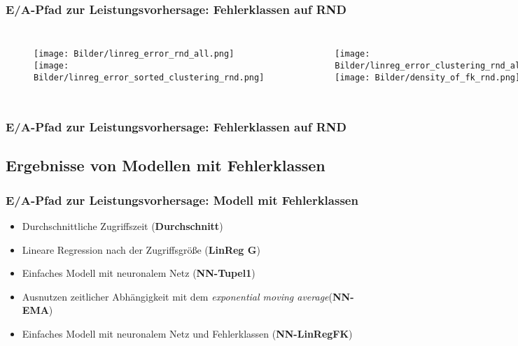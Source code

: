 \documentclass{beamer}
\begin{document}
\begin{frame}
\frametitle{E/A-Pfad zur Leistungsvorhersage: Fehlerklassen auf RND}
\begin{columns}
	\begin{figure}
		\texttt{[image: Bilder/linreg\_error\_rnd\_all.png]}\\
		\texttt{[image: Bilder/linreg\_error\_sorted\_clustering\_rnd.png]}
	\end{figure}
	\begin{figure}
		\texttt{[image: Bilder/linreg\_error\_clustering\_rnd\_all.png]}\\
		\texttt{[image: Bilder/density\_of\_fk\_rnd.png]}
	\end{figure}
\end{columns}
\end{frame}

\begin{frame}
\frametitle{E/A-Pfad zur Leistungsvorhersage: Fehlerklassen auf RND}
\begin{table}
\end{table}
\end{frame}

\subsection{Ergebnisse von Modellen mit Fehlerklassen}
\begin{frame}
\frametitle{E/A-Pfad zur Leistungsvorhersage: Modell mit Fehlerklassen}
\begin{itemize}
	\item Durchschnittliche Zugriffszeit (\textbf{Durchschnitt})
	\item Lineare Regression nach der Zugriffsgröße (\textbf{LinReg G})
	\item Einfaches Modell mit neuronalem Netz (\textbf{NN-Tupel1})
	\item Ausnutzen zeitlicher Abhängigkeit mit dem \textit{exponential moving average}(\textbf{NN-EMA})
	\pause
	\item Einfaches Modell mit neuronalem Netz und Fehlerklassen (\textbf{NN-LinRegFK})
\end{itemize}
\end{frame}
\end{document}
